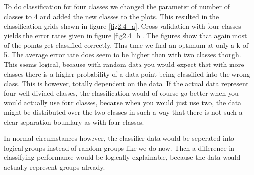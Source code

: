 \documentclass[10pt]{article}
\begin{document}
\subsection{}
To do classification for four classes we changed the parameter of number of classes to 4 and added the new classes to the plots. This resulted in the classification grids shown in figure \ref{fig2.4_a}. Cross validation with four classes yields the error rates given in figure \ref{fig2.4_b}. The figures show that again most of the points get classified correctly. This time we find an optimum at only a k of 5. The average error rate does seem to be higher than with two classes though. This seems logical, because with random data you would expect that with more classes there is a higher probability of a data point being classified into the wrong class. This is however, totally dependent on the data. If the actual data represent four well divided classes, the classification would of course go better when you would actually use four classes, because when you would just use two, the data might be distributed over the two classes in such a way that there is not such a clear separation boundary as with four classes. 

In normal circumstances however, the classifier data would be seperated into logical groups instead of random groups like we do now. Then a difference in classifying performance would be logically explainable, because the data would actually represent groups already.
\end{document}

